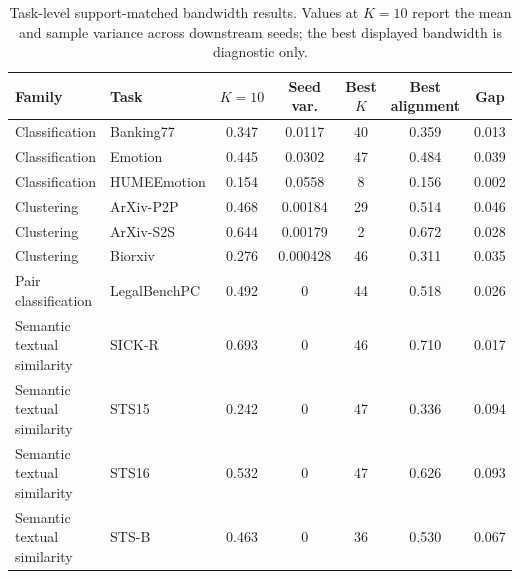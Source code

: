 \begin{table}[t]
\centering
\caption{Task-level support-matched bandwidth results. Values at $K=10$ report the mean and sample variance across downstream seeds; the best displayed bandwidth is diagnostic only.}
\label{tab:bandwidth_task_summary}
\footnotesize
\setlength{\tabcolsep}{4.0pt}
\renewcommand{\arraystretch}{1.08}
\begin{tabular*}{\textwidth}{@{\extracolsep{\fill}}llccccc@{}}
\toprule
\textbf{Family} & \textbf{Task} & \textbf{$K=10$} & \textbf{Seed var.} & \textbf{Best $K$} & \textbf{Best alignment} & \textbf{Gap} \\
\midrule
Classification & Banking77 & 0.347 & 0.0117 & 40 & 0.359 & 0.013 \\
Classification & Emotion & 0.445 & 0.0302 & 47 & 0.484 & 0.039 \\
Classification & HUMEEmotion & 0.154 & 0.0558 & 8 & 0.156 & 0.002 \\
Clustering & ArXiv-P2P & 0.468 & 0.00184 & 29 & 0.514 & 0.046 \\
Clustering & ArXiv-S2S & 0.644 & 0.00179 & 2 & 0.672 & 0.028 \\
Clustering & Biorxiv & 0.276 & 0.000428 & 46 & 0.311 & 0.035 \\
Pair classification & LegalBenchPC & 0.492 & 0 & 44 & 0.518 & 0.026 \\
Semantic textual similarity & SICK-R & 0.693 & 0 & 46 & 0.710 & 0.017 \\
Semantic textual similarity & STS15 & 0.242 & 0 & 47 & 0.336 & 0.094 \\
Semantic textual similarity & STS16 & 0.532 & 0 & 47 & 0.626 & 0.093 \\
Semantic textual similarity & STS-B & 0.463 & 0 & 36 & 0.530 & 0.067 \\
\bottomrule
\end{tabular*}
\end{table}

